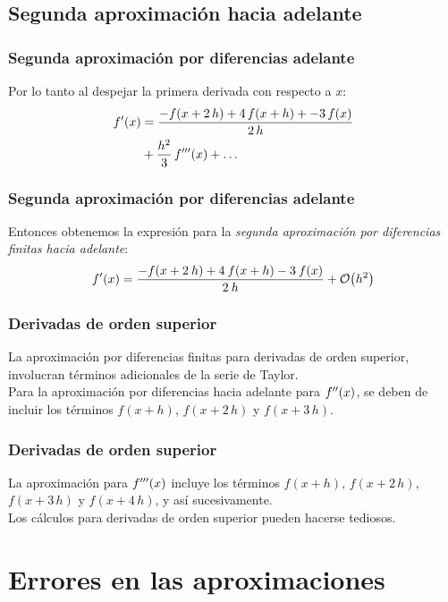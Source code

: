 \subsection*{Segunda aproximación hacia adelante}
\begin{frame}
\frametitle{Segunda aproximación por diferencias adelante}
Por lo tanto al despejar la primera derivada con respecto a $x$:
\begin{align*}
{f}^{\prime}(x) &= \dfrac{-f(x + 2 \, h) + 4 \, f(x + h) + - 3 \, f(x)}{2 \, h} \\
&+ \dfrac{h^{2}}{3} \, {f}^{\prime \prime \prime}(x) + \ldots
\end{align*}
\end{frame}
\begin{frame}
\frametitle{Segunda aproximación por diferencias adelante}
Entonces obtenemos la expresión para la \emph{segunda aproximación por diferencias finitas hacia adelante}:
\begin{align}
\ptilde{f}(x) = \dfrac{-f(x + 2 \: h) + 4 \: f(x + h) - 3 \: f(x)}{2 \: h} + \order{h^{2}}
\label{eq:ecuacion_5_08}
\end{align}
\end{frame}
\begin{frame}
\frametitle{Derivadas de orden superior}
La aproximación por diferencias finitas para derivadas de orden superior, involucran términos adicionales de la serie de Taylor.
\\
\bigskip
\pause
Para la aproximación por diferencias hacia adelante para ${f}^{\prime \prime}(x)$, se deben de incluir los términos $f(x + h)$, $f(x +  2 \, h)$ y $f(x +  3 \, h)$.
\end{frame}
\begin{frame}
\frametitle{Derivadas de orden superior}
La aproximación para ${f}^{\prime \prime \prime}(x)$ incluye los términos  $f(x + h)$, $f(x +  2 \, h)$, $f(x +  3 \, h)$ y $f(x +  4 \, h)$, y así sucesivamente.
\\
\bigskip
\pause
Los cálculos para derivadas de orden superior pueden hacerse tediosos.
\end{frame}
\section{Errores en las aproximaciones}
